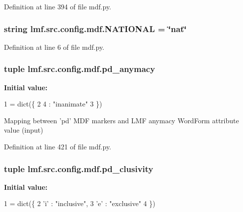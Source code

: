 Definition at line 394 of file mdf.\+py.

\hypertarget{namespacelmf_1_1src_1_1config_1_1mdf_ae420b51631e5e37ccde4de5d72d05fae}{
\subsubsection[{N\+A\+T\+I\+O\+N\+A\+L}]{\setlength{\rightskip}{0pt plus 5cm}string lmf.\+src.\+config.\+mdf.\+N\+A\+T\+I\+O\+N\+A\+L = \char`\"{}nat\char`\"{}}}\label{namespacelmf_1_1src_1_1config_1_1mdf_ae420b51631e5e37ccde4de5d72d05fae}


Definition at line 6 of file mdf.\+py.

\hypertarget{namespacelmf_1_1src_1_1config_1_1mdf_a011f241f41e3620deefe53cbb42286b9}{
\subsubsection[{pd\+\_\+anymacy}]{\setlength{\rightskip}{0pt plus 5cm}tuple lmf.\+src.\+config.\+mdf.\+pd\+\_\+anymacy}}\label{namespacelmf_1_1src_1_1config_1_1mdf_a011f241f41e3620deefe53cbb42286b9}
{\bfseries Initial value\+:}
\begin{DoxyCode}
1 = dict(\{
2     4 : \textcolor{stringliteral}{"inanimate"}
3 \})
\end{DoxyCode}


Mapping between 'pd' M\+D\+F markers and L\+M\+F anymacy Word\+Form attribute value (input) 



Definition at line 421 of file mdf.\+py.

\hypertarget{namespacelmf_1_1src_1_1config_1_1mdf_ac57ebe92cdf841d8d1bfe1e1b94b96bb}{
\subsubsection[{pd\+\_\+clusivity}]{\setlength{\rightskip}{0pt plus 5cm}tuple lmf.\+src.\+config.\+mdf.\+pd\+\_\+clusivity}}\label{namespacelmf_1_1src_1_1config_1_1mdf_ac57ebe92cdf841d8d1bfe1e1b94b96bb}
{\bfseries Initial value\+:}
\begin{DoxyCode}
1 = dict(\{
2     \textcolor{stringliteral}{'i'}     : \textcolor{stringliteral}{"inclusive"},
3     \textcolor{stringliteral}{'e'}     : \textcolor{stringliteral}{"exclusive"}
4 \})
\end{DoxyCode}


